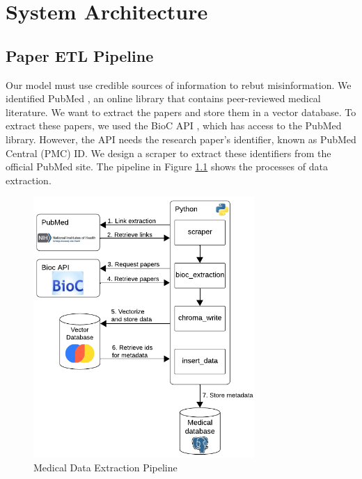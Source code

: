 



\chapter{System Architecture}  

\section{Paper ETL Pipeline}

Our model must use credible sources of information to rebut misinformation. We identified PubMed \cite{pubmed}, an online library that contains peer-reviewed medical literature. We want to extract the papers and store them in a vector database. To extract these papers, we used the BioC API \cite{bioinformatics}, which has access to the PubMed library. However, the API needs the research paper's identifier, known as PubMed Central (PMC) ID. We design a scraper to extract these identifiers from the official PubMed site. The pipeline in Figure \ref{fig:etl} shows the processes of data extraction. 

\begin{figure}[H]
	\begin{center}
		\includegraphics[width=0.75\textwidth]{images/ETL_Pipeline.png} %
	\end{center}
	\caption{Medical Data Extraction Pipeline} %
	\label{fig:etl}
\end{figure}

